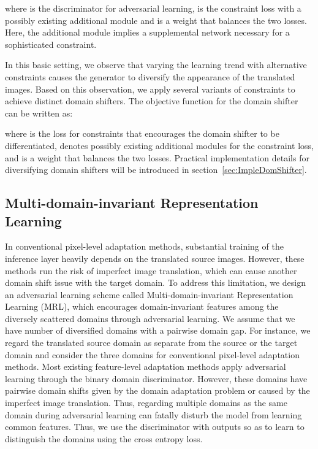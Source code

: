 \documentclass[10pt,twocolumn,letterpaper]{article}
\begin{document}
where  is the discriminator for adversarial learning,  is the constraint loss with a possibly existing additional module  and  is a weight that balances the two losses.
Here, the additional module implies a supplemental network necessary for a sophisticated constraint.

In this basic setting, we observe that varying the learning trend with alternative constraints causes the generator  to diversify the appearance of the translated images.
Based on this observation, we apply several variants of constraints to achieve distinct domain shifters.
The objective function for the domain shifter can be written as:

where  is the loss for constraints that encourages the domain shifter to be differentiated,  denotes possibly existing additional modules for the constraint loss, and  is a weight that balances the two losses.
Practical implementation details for diversifying domain shifters will be introduced in section~\ref{sec:ImpleDomShifter}.



\subsection{Multi-domain-invariant Representation Learning}
In conventional pixel-level adaptation methods, substantial training of the inference layer heavily depends on the translated source images.
However, these methods run the risk of imperfect image translation, which can cause another domain shift issue with the target domain.
To address this limitation, we design an adversarial learning scheme called Multi-domain-invariant Representation Learning (MRL), which encourages domain-invariant features among the diversely scattered domains through adversarial learning.
We assume that we have  number of diversified domains with a pairwise domain gap. For instance, we regard the translated source domain as separate from the source or the target domain and consider the three domains for conventional pixel-level adaptation methods. 
Most existing feature-level adaptation methods apply adversarial learning through the binary domain discriminator.
However, these domains have pairwise domain shifts given by the domain adaptation problem or caused by the imperfect image translation.
Thus, regarding multiple domains as the same domain during adversarial learning can fatally disturb the model from learning common features.
Thus, we use the discriminator with  outputs so as to learn to distinguish the domains using the cross entropy loss.
\end{document}
